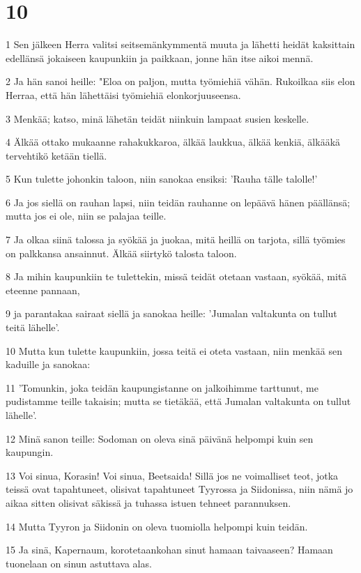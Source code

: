 \chapter{10}

\par 1 Sen jälkeen Herra valitsi seitsemänkymmentä muuta ja lähetti heidät kaksittain edellänsä jokaiseen kaupunkiin ja paikkaan, jonne hän itse aikoi mennä.
\par 2 Ja hän sanoi heille: "Eloa on paljon, mutta työmiehiä vähän. Rukoilkaa siis elon Herraa, että hän lähettäisi työmiehiä elonkorjuuseensa.
\par 3 Menkää; katso, minä lähetän teidät niinkuin lampaat susien keskelle.
\par 4 Älkää ottako mukaanne rahakukkaroa, älkää laukkua, älkää kenkiä, älkääkä tervehtikö ketään tiellä.
\par 5 Kun tulette johonkin taloon, niin sanokaa ensiksi: 'Rauha tälle talolle!'
\par 6 Ja jos siellä on rauhan lapsi, niin teidän rauhanne on lepäävä hänen päällänsä; mutta jos ei ole, niin se palajaa teille.
\par 7 Ja olkaa siinä talossa ja syökää ja juokaa, mitä heillä on tarjota, sillä työmies on palkkansa ansainnut. Älkää siirtykö talosta taloon.
\par 8 Ja mihin kaupunkiin te tulettekin, missä teidät otetaan vastaan, syökää, mitä eteenne pannaan,
\par 9 ja parantakaa sairaat siellä ja sanokaa heille: 'Jumalan valtakunta on tullut teitä lähelle'.
\par 10 Mutta kun tulette kaupunkiin, jossa teitä ei oteta vastaan, niin menkää sen kaduille ja sanokaa:
\par 11 'Tomunkin, joka teidän kaupungistanne on jalkoihimme tarttunut, me pudistamme teille takaisin; mutta se tietäkää, että Jumalan valtakunta on tullut lähelle'.
\par 12 Minä sanon teille: Sodoman on oleva sinä päivänä helpompi kuin sen kaupungin.
\par 13 Voi sinua, Korasin! Voi sinua, Beetsaida! Sillä jos ne voimalliset teot, jotka teissä ovat tapahtuneet, olisivat tapahtuneet Tyyrossa ja Siidonissa, niin nämä jo aikaa sitten olisivat säkissä ja tuhassa istuen tehneet parannuksen.
\par 14 Mutta Tyyron ja Siidonin on oleva tuomiolla helpompi kuin teidän.
\par 15 Ja sinä, Kapernaum, korotetaankohan sinut hamaan taivaaseen? Hamaan tuonelaan on sinun astuttava alas.
